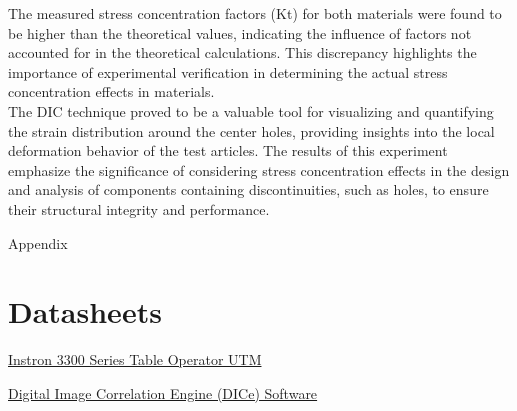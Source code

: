 \documentclass{article}
\begin{document}
The measured stress concentration factors (Kt) for both materials were found to be higher than the theoretical values, indicating the influence of factors not accounted for in the theoretical calculations. This discrepancy highlights the importance of experimental verification in determining the actual stress concentration effects in materials. \\

The DIC technique proved to be a valuable tool for visualizing and quantifying the strain distribution around the center holes, providing insights into the local deformation behavior of the test articles. The results of this experiment emphasize the significance of considering stress concentration effects in the design and analysis of components containing discontinuities, such as holes, to ensure their structural integrity and performance.

\newpage
\thispagestyle{empty}  %
\begin{center}
	\vspace*{\fill}
	{\Huge Appendix}
	\vspace*{\fill}
\end{center}

\newpage
\begin{appendices}
\pagestyle{fancy}
\renewcommand{\thefigure}{A\arabic{figure}}
\setcounter{figure}{0}

\pagebreak

\hypertarget{datasheets}{}
\section{Datasheets}
\begin{enumerate}[label = {[\arabic*]}]
\small
\item \hypertarget{1}{\href{https://www.instron.com/en/products/testing-systems/universal-testing-systems/low-force-universal-testing-systems/3300-series}{Instron 3300 Series Table Operator UTM}}
\item \hypertarget{2}{\href{https://www.sandia.gov/ccr/software/digital-image-correlation-engine-dice/}{Digital Image Correlation Engine (DICe) Software}}


\end{enumerate}

\end{appendices}
\end{document}
